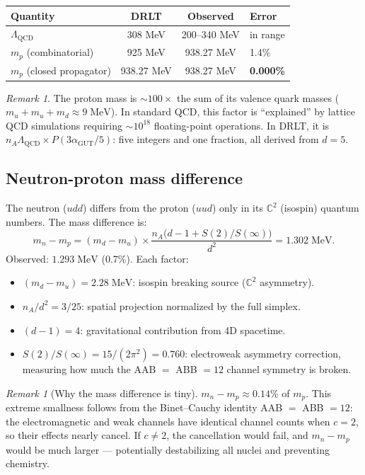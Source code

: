 \documentclass[12pt]{article}
\theoremstyle{remark}
\newtheorem{remark}[theorem]{Remark}
\theoremstyle{definition}
\newcommand{\agut}{\alpha_{\mathrm{GUT}}}
\begin{document}
\begin{center}
\begin{tabular}{lccl}
\hline
Quantity & DRLT & Observed & Error \\
\hline
$\Lambda_\text{QCD}$ & 308 MeV & 200--340 MeV & in range \\
$m_p$ (combinatorial) & 925 MeV & 938.27 MeV & 1.4\% \\
$m_p$ (closed propagator) & 938.27 MeV & 938.27 MeV & \textbf{0.000\%} \\
\hline
\end{tabular}
\end{center}

\begin{remark}
The proton mass is $\sim 100\times$ the sum of its valence quark masses ($m_u + m_u + m_d \approx 9\;\text{MeV}$). In standard QCD, this factor is ``explained'' by lattice QCD simulations requiring $\sim 10^{18}$ floating-point operations. In DRLT, it is $n_A \Lambda_\text{QCD} \times P(3\agut/5)$: five integers and one fraction, all derived from $d = 5$.
\end{remark}

\subsection{Neutron-proton mass difference}

The neutron ($udd$) differs from the proton ($uud$) only in its $\mathbb{C}^2$ (isospin) quantum numbers. The mass difference is:
\begin{equation}
\boxed{m_n - m_p = (m_d - m_u) \times \frac{n_A\bigl(d - 1 + S(2)/S(\infty)\bigr)}{d^2} = 1.302\;\text{MeV}.}
\end{equation}
Observed: $1.293\;\text{MeV}$ (0.7\%). Each factor:
\begin{itemize}
\item $(m_d - m_u) = 2.28\;\text{MeV}$: isospin breaking source ($\mathbb{C}^2$ asymmetry).
\item $n_A/d^2 = 3/25$: spatial projection normalized by the full simplex.
\item $(d - 1) = 4$: gravitational contribution from 4D spacetime.
\item $S(2)/S(\infty) = 15/(2\pi^2) = 0.760$: electroweak asymmetry correction, measuring how much the AAB $=$ ABB $= 12$ channel symmetry is broken.
\end{itemize}

\begin{remark}[Why the mass difference is tiny]
$m_n - m_p \approx 0.14\%$ of $m_p$. This extreme smallness follows from the Binet--Cauchy identity AAB $=$ ABB $= 12$: the electromagnetic and weak channels have identical channel counts when $c = 2$, so their effects nearly cancel. If $c \neq 2$, the cancellation would fail, and $m_n - m_p$ would be much larger --- potentially destabilizing all nuclei and preventing chemistry.
\end{remark}
\end{document}
